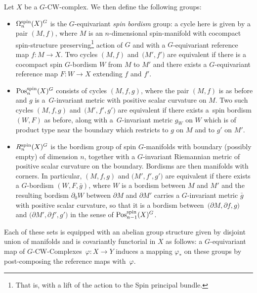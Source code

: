 \begin{Definition}\label{def:Stolz_groups}
		Let $X$ be a $G$-CW-complex. We then define the following groups:		
		\begin{itemize}\itemsep=0pt
			\item $\Omega^{\rm spin}_{n}(X)^{G}$ is the $G$-equivariant \textit{spin
				bordism} group: a cycle here is given by a pair $(M,f)$, where $M$ is an
			$n$-dimensional spin-manifold with cocompact spin-structure
			preserving\footnote{That is, with a lift of the action to the Spin principal
				bundle.} action of $G$ and with a $G$-equivariant
			reference map $f\colon M\to X$. Two cycles $(M,f)$ and~$\bigl(M',f'\bigr)$ are
			equivalent if there is a cocompact spin $G$-bordism $W$ from $M$ to $M'$
			and there exists a $G$-equivariant reference map $F\colon W\to X$
			extending $f$ and $f'$.
			\item $\mathrm{Pos}^{\rm spin}_{n}(X)^{G}$ consists of cycles $(M,f,g)$, where the pair
			$(M,f)$ is as before and $g$ is a~$G$-invariant metric with positive
			scalar curvature on $M$. Two such cycles $(M,f,g)$ and~$\bigl(M',f',g'\bigr)$ are
			equivalent if there exists a~spin bordism $(W,F)$ as before, along with a~$G$-invariant metric $g_W$ on $W$ which is of product type near the
			boundary which restricts to $g$ on $M$ and to $g'$ on $M'$.
			\item $R^{\rm spin}_{n}(X)^{G}$ is the bordism group of spin $G$-manifolds with
			boundary (possibly empty) of dimension $n$, together with a $G$-invariant
			Riemannian metric of positive scalar curvature on the boundary. Bordisms are then manifolds with
			corners. In particular, $(M,f,g)$ and $\bigl(M',f',g'\bigr)$ are equivalent if there
			exists a $G$-bordism $(W,F,\bar{g})$, where $W$ is a bordism between $M$
			and $M'$ and the resulting bordism $\partial_0 W$ between $\partial M$ and
			$\partial M'$ carries a $G$-invariant
			metric $\bar{g}$ with positive scalar curvature, so that it is a
			bordism between~${\bigl(\partial M,\partial f,g\bigr)}$ and
			$\bigl(\partial M',\partial f',g'\bigr)$ in the sense of $\mathrm{Pos}^{\rm spin}_{n-1}(X)^{G}$.
		\end{itemize}
		
		Each of these sets is equipped with an abelian group structure given by
		disjoint union of manifolds and is covariantly functorial in $X$ as follows: a $G$-equivariant map of $G$-CW-Complexes~${\varphi\colon X \rightarrow Y}$ induces a mapping $\varphi_{*}$ on these groups
		by post-composing the reference maps with~$\varphi$.
	\end{Definition}
	
